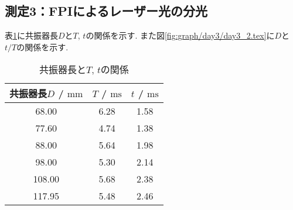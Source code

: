\subsection{測定3：FPIによるレーザー光の分光}
表\ref{tab:kyosinki_Tt}に共振器長$D$と$T$, $t$の関係を示す.
また図\ref{fig:graph/day3/day3_2.tex}に$D$と$t/T$の関係を示す.
\begin{table}[h]
\caption{共振器長と$T$, $t$の関係}
\label{tab:kyosinki_Tt}
\centering
\begin{tabular}{c|cc}
\hline
共振器長$D$ / $\si{\milli\metre}$&$T$ / $\si{\milli\second}$&$t$ / $\si{\milli\second}$\\
\hline \hline
68.00 & 6.28 & 1.58\\
77.60 & 4.74 & 1.38\\
88.00 & 5.64 & 1.98\\
98.00 & 5.30 & 2.14\\
108.00 & 5.68 & 2.38\\
117.95 & 5.48 & 2.46\\
\hline
\end{tabular}
\end{table}

